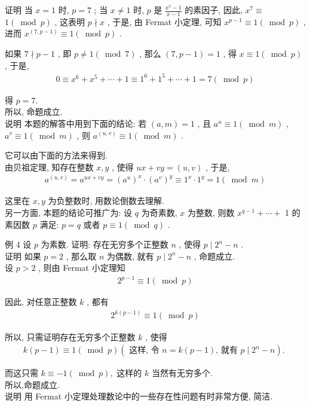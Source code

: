 	证明 当 $x=1$ 时,  $p=7$ ; 当 $x \neq 1$ 时,  $p$ 是 $\frac{x^{7}-1}{x-1}$ 的素因子, 因此,  $x^{7} \equiv$ $1(\bmod p)$ , 这表明 $p \nmid x$ , 于是, 由 Fermat 小定理, 可知 $x^{p-1} \equiv 1(\bmod p)$ , 进而 $x^{(7, p-1)} \equiv 1(\bmod p)$ .

	如果 $7 \nmid p-1$ , 即 $p \neq 1(\bmod 7)$ , 那么 $(7, p-1)=1$ , 得 $x \equiv 1(\bmod p)$ , 于是,
	\begin{align*}
		0 \equiv x^{6}+x^{5}+\cdots+1 \equiv 1^{6}+1^{5}+\cdots+1=7(\bmod p)
	\end{align*}

	得 $p=7$.\\
	所以, 命题成立.\\
	说明 本题的解答中用到下面的结论: 若 $(a, m)=1$ , 且 $a^{u} \equiv 1(\bmod m)$ ,  $a^{v} \equiv 1(\bmod m)$ , 则 $a^{(u, v)} \equiv 1(\bmod m)$ .

	它可以由下面的方法来得到.\\
	由贝祖定理, 知存在整数 $x ,  y$ , 使得 $u x+v y=(u, v)$ , 于是,
	\begin{align*}
		a^{(u, v)}=a^{u x+v y}=\left(a^{u}\right)^{x} \cdot\left(a^{v}\right)^{y} \equiv 1^{x} \cdot 1^{y}=1(\bmod m)
	\end{align*}

	这里在 $x ,  y$ 为负整数时, 用数论倒数去理解. \\
	另一方面, 本题的结论可推广为: 设 $q$ 为奇素数,  $x$ 为整数, 则数 $x^{q-1}+\cdots+$ 1 的素因数 $p$ 满足:  $p=q$ 或者 $p \equiv 1(\bmod q)$ .

	例 4 设 $p$ 为素数. 证明: 存在无穷多个正整数 $n$ , 使得 $p \mid 2^{n}-n$ . \\
	证明 如果 $p=2$ , 那么取 $n$ 为偶数, 就有 $p \mid 2^{n}-n$ , 命题成立. \\
	设 $p>2$ , 则由 Fermat 小定理知
	\begin{align*}
		2^{p-1} \equiv 1(\bmod p)
	\end{align*}

	因此, 对任意正整数 $k$ , 都有
	\begin{align*}
		2^{k(p-1)} \equiv 1(\bmod p)
	\end{align*}

	所以, 只需证明存在无穷多个正整数 $k$ , 使得
	\begin{align*}
		k(p-1) \equiv 1(\bmod p)\left(\text { 这样, 令 } n=k(p-1) \text {, 就有 } p \mid 2^{n}-n\right) \text {. }
	\end{align*}

	而这只需 $k \equiv-1(\bmod p) , $ 这样的 $k$ 当然有无穷多个.\\
	所以,命题成立.\\
	说明 用 Fermat 小定理处理数论中的一些存在性问题有时非常方便, 简洁.

